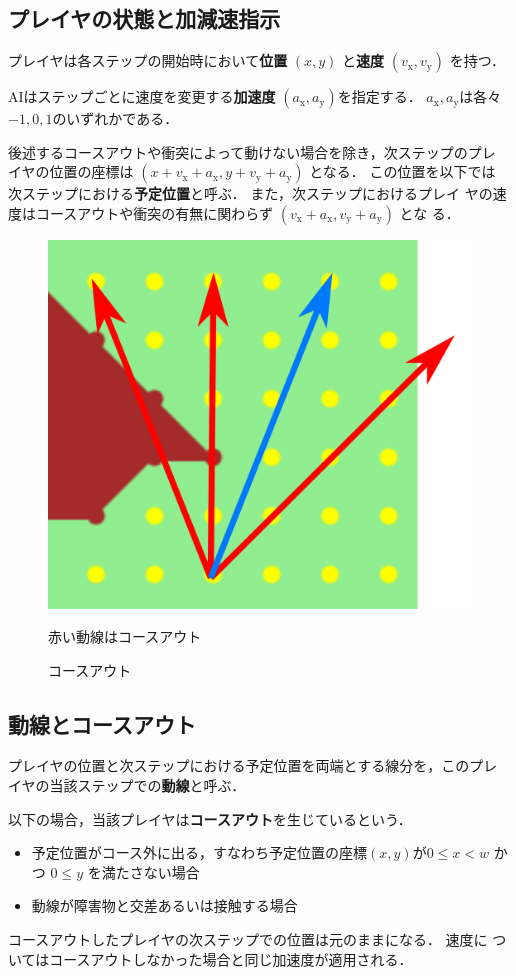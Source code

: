 \documentclass[11pt]{jarticle}
\begin{document}
\subsection{プレイヤの状態と加減速指示}
プレイヤは各ステップの開始時において{\bf 位置} $(x, y)$ と{\bf 速度}
$(v_\mathrm{x}, v_\mathrm{y})$ を持つ．

AIはステップごとに速度を変更する{\bf 加速度} $(a_\mathrm{x}, a_\mathrm{y})$を指定する．
$a_\mathrm{x}, a_\mathrm{y}$は各々$-1, 0, 1$のいずれかである．

後述するコースアウトや衝突によって動けない場合を除き，次ステップのプレ
イヤの位置の座標は $(x+v_\mathrm{x}+a_\mathrm{x}, y+v_\mathrm{y}+a_\mathrm{y})$ となる． この位置を以下では
次ステップにおける{\bf 予定位置}と呼ぶ． また，次ステップにおけるプレイ
ヤの速度はコースアウトや衝突の有無に関わらず $(v_\mathrm{x}+a_\mathrm{x}, v_\mathrm{y}+a_\mathrm{y})$ とな
る．

\begin{figure}
  \vspace{-1cm}
  \centering
  \includegraphics[width=0.26\columnwidth, natwidth=1358, natheight=1181]{courseout.png}
  \caption{コースアウト}
  \label{fig:courseout}
  赤い動線はコースアウト
  \vspace{-1cm}
\end{figure}

\subsection{動線とコースアウト}

プレイヤの位置と次ステップにおける予定位置を両端とする線分を，このプレ
イヤの当該ステップでの{\bf 動線}と呼ぶ．

以下の場合，当該プレイヤは{\bf コースアウト}を生じているという．
\begin{itemize}
\item
  予定位置がコース外に出る，すなわち予定位置の座標$(x,y)$が$0 \le x <
  w$ かつ $0 \le y$ を満たさない場合
\item
  動線が障害物と交差あるいは接触する場合
\end{itemize}
コースアウトしたプレイヤの次ステップでの位置は元のままになる．  速度に
ついてはコースアウトしなかった場合と同じ加速度が適用される．
\end{document}
